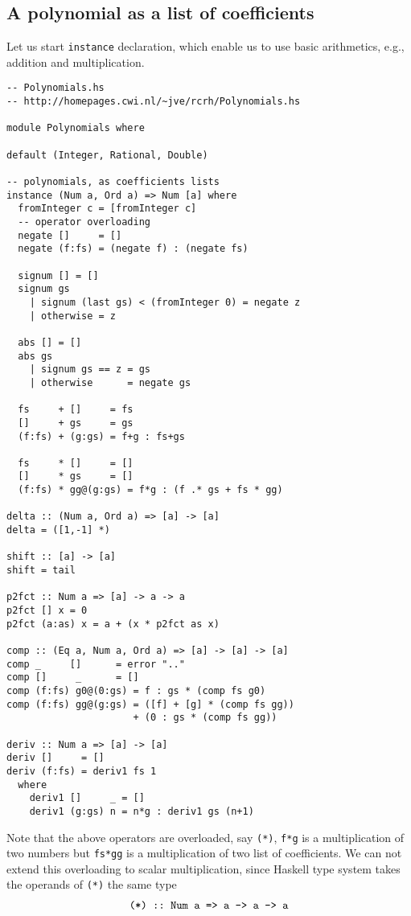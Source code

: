 \documentclass[11pt]{book}
\begin{document}
\subsection{A polynomial as a list of coefficients}
Let us start \texttt{instance} declaration, which enable us to use basic arithmetics, e.g., addition and multiplication.
\begin{verbatim}
-- Polynomials.hs
-- http://homepages.cwi.nl/~jve/rcrh/Polynomials.hs

module Polynomials where

default (Integer, Rational, Double) 

-- polynomials, as coefficients lists
instance (Num a, Ord a) => Num [a] where
  fromInteger c = [fromInteger c] 
  -- operator overloading
  negate []     = []
  negate (f:fs) = (negate f) : (negate fs)

  signum [] = []
  signum gs 
    | signum (last gs) < (fromInteger 0) = negate z
    | otherwise = z

  abs [] = []
  abs gs 
    | signum gs == z = gs
    | otherwise      = negate gs

  fs     + []     = fs
  []     + gs     = gs
  (f:fs) + (g:gs) = f+g : fs+gs

  fs     * []     = []
  []     * gs     = []
  (f:fs) * gg@(g:gs) = f*g : (f .* gs + fs * gg)

delta :: (Num a, Ord a) => [a] -> [a]
delta = ([1,-1] *)

shift :: [a] -> [a]
shift = tail 

p2fct :: Num a => [a] -> a -> a
p2fct [] x = 0
p2fct (a:as) x = a + (x * p2fct as x)

comp :: (Eq a, Num a, Ord a) => [a] -> [a] -> [a]
comp _     []      = error ".."
comp []     _      = []
comp (f:fs) g0@(0:gs) = f : gs * (comp fs g0)
comp (f:fs) gg@(g:gs) = ([f] + [g] * (comp fs gg))
                      + (0 : gs * (comp fs gg))

deriv :: Num a => [a] -> [a]
deriv []     = []
deriv (f:fs) = deriv1 fs 1 
  where 
    deriv1 []     _ = []
    deriv1 (g:gs) n = n*g : deriv1 gs (n+1)

\end{verbatim}
Note that the above operators are overloaded, say \texttt{(*)}, \texttt{f*g} is a multiplication of two numbers but \texttt{fs*gg} is a multiplication of two list of coefficients.
We can not extend this overloading to scalar multiplication, since Haskell type system takes the operands of \texttt{(*)} the same type
\begin{eqnarray}
\verb+(*) :: Num a => a -> a -> a+
\end{eqnarray}
\end{document}
